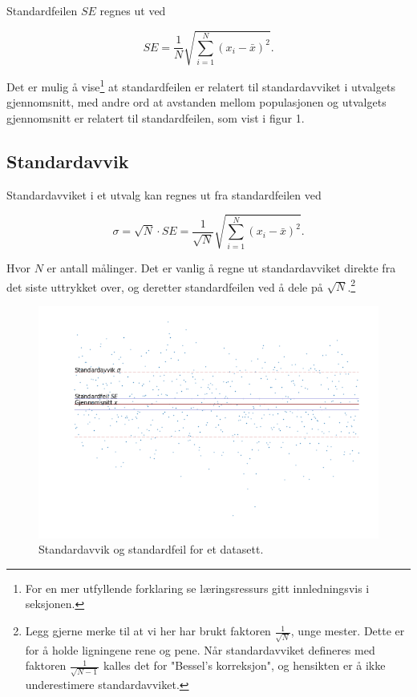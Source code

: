 \documentclass[a4paper,9pt]{article}
\begin{document}
Standardfeilen $SE$ regnes ut ved

\begin{equation}
\label{eqn:standarderror}
SE = \frac{1}{N} \sqrt{\sum_{i=1}^N (x_i - \bar{x})^2}.
\end{equation}

Det er mulig å vise\footnote{For en mer utfyllende forklaring se læringsressurs gitt innledningsvis i seksjonen.} at standardfeilen er relatert til standardavviket i utvalgets gjennomsnitt, med andre ord at avstanden mellom populasjonen og utvalgets gjennomsnitt er relatert til standardfeilen, som vist i figur 1. 

\FloatBarrier

\subsection{Standardavvik}

Standardavviket i et utvalg kan regnes ut fra standardfeilen ved

\begin{equation}
\label{eqn:standarddev}
\sigma = \sqrt{N} \cdot SE =\frac{1}{\sqrt{N}} \sqrt{ \sum_{i=1}^N (x_i - \bar{x})^2} .
\end{equation}

Hvor $N$ er antall målinger. Det er vanlig å regne ut standardavviket direkte fra det siste uttrykket over, og deretter standardfeilen ved å dele på $\sqrt{N}$.\footnote{Legg gjerne merke til at vi her har brukt faktoren $\frac{1}{\sqrt{N}}$, unge mester. Dette er for å holde ligningene rene og pene. Når standardavviket defineres med faktoren $\frac{1}{\sqrt{N-1}}$  kalles det for "Bessel's korreksjon", og hensikten er å ikke underestimere standardavviket.}

\begin{figure}[h]
\centering
\includegraphics[width=\textwidth]{standardfeil1}
\caption{Standardavvik og standardfeil for et datasett.}
\end{figure}
 
\end{document}
